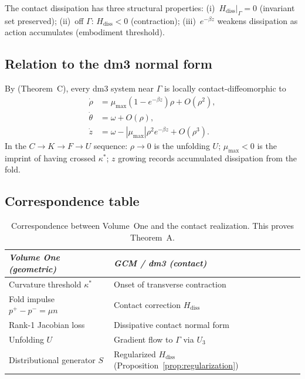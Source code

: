 \documentclass[12pt]{article}
\numberwithin{equation}{section}
\theoremstyle{remark}
\newcommand{\Orb}{\Gamma}
\newcommand{\abs}[1]{\left|#1\right|}
\begin{document}
The contact dissipation has three structural properties:
(i)~$H_{\mathrm{diss}}|_\Orb=0$ (invariant set preserved);
(ii)~off $\Orb$: $H_{\mathrm{diss}}<0$ (contraction);
(iii)~$e^{-\beta z}$ weakens dissipation as action accumulates
(embodiment threshold).

\subsection{Relation to the dm3 normal form}

By \cite{Paper1} (Theorem~C), every dm3 system near $\Orb$ is
locally contact-diffeomorphic to
\begin{align}
  \dot\rho &= \mu_{\max}(1-e^{-\beta z})\rho + O(\rho^2),\\
  \dot\theta &= \omega + O(\rho),\\
  \dot z &= \omega - \abs{\mu_{\max}}\rho^2 e^{-\beta z} + O(\rho^3).
\end{align}
In the $C\to K\to F\to U$ sequence:
$\rho\to 0$ is the unfolding $U$;
$\mu_{\max}<0$ is the imprint of having crossed $\kappa^*$;
$z$ growing records accumulated dissipation from the fold.

\subsection{Correspondence table}

\begin{table}[ht]
\centering
\begin{tabular}{ll}
\toprule
\emph{Volume One (geometric)} & \emph{GCM / dm3 (contact)} \\
\midrule
Curvature threshold $\kappa^*$
  & Onset of transverse contraction \\
Fold impulse $p^+-p^-=\mu n$
  & Contact correction $H_{\mathrm{diss}}$ \\
Rank-1 Jacobian loss
  & Dissipative contact normal form \\
Unfolding $U$
  & Gradient flow to $\Orb$ via $U_3$~\cite{Paper1} \\
Distributional generator $S$
  & Regularized $H_{\mathrm{diss}}$
    (Proposition~\ref{prop:regularization}) \\
\bottomrule
\end{tabular}
\caption{Correspondence between Volume~One and the contact
  realization. This proves Theorem~A.}
\label{tab:correspondence}
\end{table}

\end{document}
